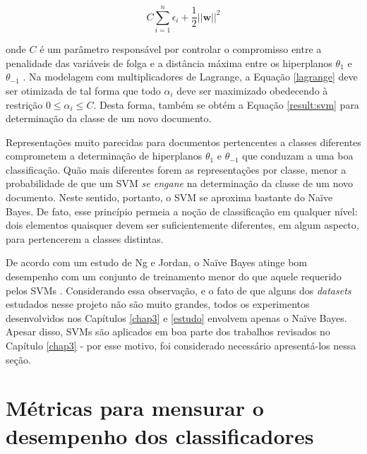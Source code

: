 \begin{equation}
\label{nonlin:svm}
\ensuremath{C\sum_{i=1}^n\epsilon_i + \frac{1}{2}||}\textbf{w}\ensuremath{||^2}
\end{equation}

onde \ensuremath{C} é um parâmetro responsável por controlar o compromisso entre a penalidade das variáveis de folga e a distância máxima entre os hiperplanos \ensuremath{\theta_1} e \ensuremath{\theta_{-1}} \cite{mono-puc}. Na modelagem com multiplicadores de Lagrange, a Equação \ref{lagrange} deve ser otimizada de tal forma que todo \ensuremath{\alpha_i} deve ser maximizado obedecendo à restrição \ensuremath{0 \leq \alpha_i \leq C}. Desta forma, também se obtém a Equação \ref{result:svm} para determinação da classe de um novo documento.

Representações muito parecidas para documentos pertencentes a classes diferentes comprometem a determinação de hiperplanos \ensuremath{\theta_1} e \ensuremath{\theta_{-1}} que conduzam a uma boa classificação. Quão mais diferentes forem as representações por classe, menor a probabilidade de que um SVM \emph{se engane} na determinação da classe de um novo documento. Neste sentido, portanto, o SVM se aproxima bastante do Naïve Bayes. De fato, esse princípio permeia a noção de classificação em qualquer nível: dois elementos quaisquer devem ser suficientemente diferentes, em algum aspecto, para pertencerem a classes distintas.

De acordo com um estudo de Ng e Jordan, o Naïve Bayes atinge bom desempenho com um conjunto de treinamento menor do que aquele requerido pelos SVMs \cite{ng-jordan}. Considerando essa observação, e o fato de que alguns dos \emph{datasets} estudados nesse projeto não são muito grandes, todos os experimentos desenvolvidos nos Capítulos \ref{chap3} e \ref{estudo} envolvem apenas o Naïve Bayes. Apesar disso, SVMs são aplicados em boa parte dos trabalhos revisados no Capítulo \ref{chap3} - por esse motivo, foi considerado necessário apresentá-los nessa seção.




\section{Métricas para mensurar o desempenho dos classificadores}
\label{metricas}

